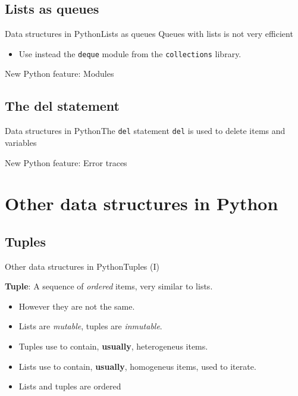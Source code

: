 \documentclass[10pt,compress]{beamer} %
\begin{document}
{\subsection{Lists as queues}
\begin{frame}[fragile]{Data structures in Python}{Lists as queues}
	Queues with lists is not very efficient
	\begin{itemize}
	\item Use instead the \texttt{deque} module from the \texttt{collections} library.
	\end{itemize}
	\normalsize{
		\begin{block}{}
		\vspace{-0.2cm}
		
		\vspace{-0.2cm}
		\end{block}
		}
	\normalsize{New Python feature: Modules}
\end{frame}

\subsection{The del statement}
\begin{frame}[plain]{Data structures in Python}{The \texttt{del} statement}
	\texttt{del} is used to delete items and variables

	\footnotesize{
		\begin{block}{}
		\vspace{-0.2cm}
		
		\vspace{-0.2cm}
		\end{block}
	}

	\normalsize{New Python feature: Error traces}
\end{frame}

\section{Other data structures in Python}
\subsection{Tuples}
\begin{frame}{Other data structures in Python}{Tuples (I)}

	\textbf{Tuple}: A sequence of \textit{ordered} items, very similar to lists.
		\begin{itemize}
		\item \small However they are not the same.
		\item \small Lists are \textit{mutable}, tuples are \textit{inmutable}.
		\item \small Tuples use to contain, \textbf{usually}, heterogeneus items.
		\item \small Lists use to contain, \textbf{usually}, homogeneus items, used to iterate.
        \item Lists and tuples are ordered
		\end{itemize}
	

\end{frame}}
\end{document}
